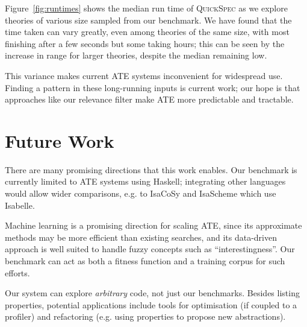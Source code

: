 \documentclass[]{default}
\begin{document}
Figure~\ref{fig:runtimes} shows the median run time of \textsc{QuickSpec} as we
explore theories of various size sampled from our benchmark. We have found that
the time taken can vary greatly, even among theories of the same size, with most
finishing after a few seconds but some taking hours; this can be seen by the
increase in range for larger theories, despite the median remaining low.

This variance makes current ATE systems inconvenient for widespread use. Finding
a pattern in these long-running inputs is current work; our hope is that
approaches like our relevance filter make ATE more predictable and tractable.

\section{Future Work}\label{future-work}

There are many promising directions that this work enables. Our benchmark is
currently limited to ATE systems using Haskell; integrating other languages
would allow wider comparisons, e.g. to IsaCoSy and IsaScheme which use Isabelle.

Machine learning is a promising direction for scaling ATE, since its approximate
methods may be more efficient than existing searches, and its data-driven
approach is well suited to handle fuzzy concepts such as ``interestingness''.
Our benchmark can act as both a fitness function and a training corpus for such
efforts.

Our system can explore \emph{arbitrary} code, not just our benchmarks. Besides
listing properties, potential applications include tools for optimisation (if
coupled to a profiler) and refactoring (e.g. using properties to propose new
abstractions).



\end{document}
